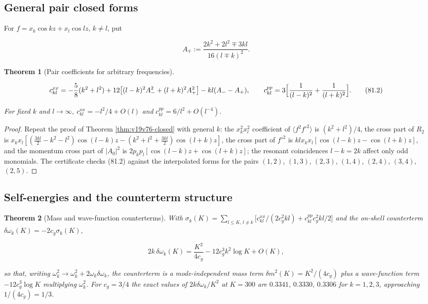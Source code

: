 \documentclass[11pt]{article}
\newtheorem{theorem}{Theorem}[section]
\theoremstyle{remark}
\begin{document}
\subsection{General pair closed forms}

For \(f=x_k\cos kz+x_l\cos lz\), \(k\neq l\), put

\[
 A_\mp:=\frac{2k^2+2l^2\mp3kl}{16(l\mp k)^2}.                             \tag{81.1}
\]

\begin{theorem}[Pair coefficients for arbitrary frequencies]
\label{thm:v19v78-closed}

\[
 c^{xx}_{kl}=-\frac58(k^2+l^2)+12\bigl[(l-k)^2A_-^2+(l+k)^2A_+^2\bigr]-kl(A_--A_+),
 \qquad
 c^{pp}_{kl}=3\Bigl[\frac1{(l-k)^2}+\frac1{(l+k)^2}\Bigr].                \tag{81.2}
\]

For fixed \(k\) and \(l\to\infty\), \(c^{xx}_{kl}=-l^2/4+O(l)\) and
\(c^{pp}_{kl}=6/l^2+O(l^{-4})\).
\end{theorem}

\begin{proof}
Repeat the proof of Theorem \ref{thm:v19v76-closed} with general
\(k\): the \(x_k^2x_l^2\) coefficient of \(\langle f^2f'^2\rangle\) is
\((k^2+l^2)/4\), the cross part of \(R_2\) is
\(x_kx_l[(\tfrac{3kl}2-k^2-l^2)\cos(l-k)z-(k^2+l^2+\tfrac{3kl}2)\cos(l+k)z]\),
the cross part of \(f'^2\) is \(klx_kx_l[\cos(l-k)z-\cos(l+k)z]\), and
the momentum cross part of \(|A_0|^2\) is
\(2p_kp_l[\cos(l-k)z+\cos(l+k)z]\); the resonant coincidences
\(l-k=2k\) affect only odd monomials.  The certificate checks (81.2)
against the interpolated forms for the pairs \((1,2)\), \((1,3)\),
\((2,3)\), \((1,4)\), \((2,4)\), \((3,4)\), \((2,5)\).
\end{proof}

\subsection{Self-energies and the counterterm structure}

\begin{theorem}[Mass and wave-function counterterms]
\label{thm:v19v78-counterterm}
With \(\sigma_k(K)=\sum_{l\leq K,\,l\neq k}\bigl[c^{xx}_{kl}/(2c_g^2kl)+c^{pp}_{kl}c_g^2kl/2\bigr]\)
and the on-shell counterterm \(\delta\omega_k(K)=-2c_g\sigma_k(K)\),

\[
 2k\,\delta\omega_k(K)=\frac{K^2}{4c_g}-12c_g^3k^2\log K+O(K),           \tag{81.3}
\]

so that, writing \(\omega_k^2\to\omega_k^2+2\omega_k\delta\omega_k\),
the counterterm is a mode-independent mass term
\(\delta m^2(K)=K^2/(4c_g)\) plus a wave-function term
\(-12c_g^3\log K\) multiplying \(\omega_k^2\).  For \(c_g=3/4\) the
exact values of \(2k\delta\omega_k/K^2\) at \(K=300\) are
\(0.3341\), \(0.3330\), \(0.3306\) for \(k=1,2,3\), approaching
\(1/(4c_g)=1/3\).
\end{theorem}
\end{document}
